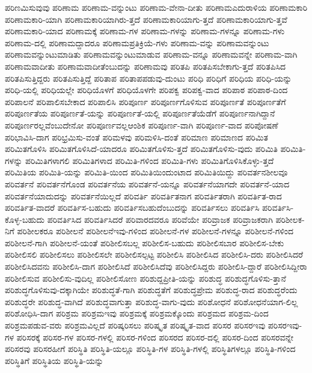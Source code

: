 {ಪರಿಣಮಿಸುವುವು
ಪರಿಣಾಮ
ಪರಿಣಾಮ-ವನ್ನುಂಟು
ಪರಿಣಾಮ-ವೇನಾ-ದೀತು
ಪರಿಣಾಮಎದುರಾಳಿಯ
ಪರಿಣಾಮಕಾರಿ
ಪರಿಣಾಮಕಾರಿ-ಯಾಗಿ
ಪರಿಣಾಮಕಾರಿಯಾಗಿರು-ತ್ತದೆ
ಪರಿಣಾಮಕಾರಿಯಾಗು-ತ್ತದೆ
ಪರಿಣಾಮಕಾರಿಯಾಗು-ತ್ತವೆ
ಪರಿಣಾಮಕಾರಿ-ಯಾದ
ಪರಿಣಾಮಕ್ಕೆ
ಪರಿಣಾಮ-ಗಳ
ಪರಿಣಾಮ-ಗಳನ್ನು
ಪರಿಣಾಮ-ಗಳನ್ನೂ
ಪರಿಣಾಮ-ಗಳು
ಪರಿಣಾಮ-ದಲ್ಲಿ
ಪರಿಣಾಮದ್ದಾದರೂ
ಪರಿಣಾಮಪ್ರತಿಕ್ರಿಯೆ-ಗಳು
ಪರಿಣಾಮ-ವನ್ನು
ಪರಿಣಾಮವನ್ನುಂಟು
ಪರಿಣಾಮವನ್ನುಂಟುಮಾಡಿತು
ಪರಿಣಾಮವನ್ನುಂಟುಮಾಡುವ
ಪರಿಣಾಮ-ವನ್ನೂ
ಪರಿಣಾಮವನ್ನೇ
ಪರಿಣಾಮ-ವಾಗಿ
ಪರಿಣಾಮವಾದೀತು
ಪರಿಣಾಮವಾದೀತೆಂಬುದನ್ನು
ಪರಿಣಾಮವು
ಪರಿತಪಿ
ಪರಿತಪಿಸಬೇಕಾಗು-ತ್ತದೆ
ಪರಿತಪಿಸಿದ
ಪರಿತಪಿಸುತ್ತಿದ್ದರು
ಪರಿತಪಿಸುತ್ತಿದ್ದೆ
ಪರಿತಾಪ
ಪರಿತಾಪಪಡುವು-ದುಂಟು
ಪರಿಧಿ
ಪರಿಧಿಗೆ
ಪರಿಧಿಯ
ಪರಿಧಿ-ಯನ್ನು
ಪರಿಧಿ-ಯಲ್ಲಿ
ಪರಿಧಿಯಲ್ಲೇ
ಪರಿಧಿಯೊಳಗೆ
ಪರಿಧಿಯೊಳಗೇ
ಪರಿಪಕ್ವ
ಪರಿಪಕ್ವ-ವಾದ
ಪರಿಪಾಠ
ಪರಿಪಾಠ-ದಿಂದ
ಪರಿಪಾಲನೆ
ಪರಿಪಾಲಿಸಬೇಕಾದ
ಪರಿಪಾಲಿಸಿ
ಪರಿಪೂರ್ಣ
ಪರಿಪೂರ್ಣಗೊಳಿಸುವ
ಪರಿಪೂರ್ಣತೆ
ಪರಿಪೂರ್ಣತೆಗೆ
ಪರಿಪೂರ್ಣತೆಯ
ಪರಿಪೂರ್ಣತೆ-ಯನ್ನು
ಪರಿಪೂರ್ಣತೆ-ಯಲ್ಲಿ
ಪರಿಪೂರ್ಣತೆಯೆಡೆಗೆ
ಪರಿಪೂರ್ಣನಾಗಿದ್ದಾನೆ
ಪರಿಪೂರ್ಣರಲ್ಲವೆಂಬುದೇನೋ
ಪರಿಪೂರ್ಣವಲ್ಲಆಂಶಿಕ
ಪರಿಪೂರ್ಣ-ವಾಗಿ
ಪರಿಪೂರ್ಣ-ವಾದ
ಪರಿಪೋಷಣೆ
ಪರಿಭಾವಿಸಿ-ದಾಗ
ಪರಿಭ್ರಮಿಸು-ವಂತೆ
ಪರಿಮಳವು
ಪರಿಮಳಿಸಿ-ದಂತೆ
ಪರಿಮಾಣ
ಪರಿಮಾಣದ
ಪರಿಮಿತ
ಪರಿಮಿತಗೊಳಿಸಿ
ಪರಿಮಿತಗೊಳಿಸಿದೆ-ಯಾದರೂ
ಪರಿಮಿತಗೊಳಿಸು-ತ್ತದೆ
ಪರಿಮಿತಗೊಳಿಸು-ವುದು
ಪರಿಮಿತಿ
ಪರಿಮಿತಿ-ಗಳನ್ನು
ಪರಿಮಿತಿಗಳಾಗಲಿ
ಪರಿಮಿತಿಗಳಾದ
ಪರಿಮಿತಿ-ಗಳಿಂದ
ಪರಿಮಿತಿ-ಗಳು
ಪರಿಮಿತಿಗೊಳಿಸಿಕೊಳ್ಳು-ತ್ತದೆ
ಪರಿಮಿತಿಯ
ಪರಿಮಿತಿ-ಯನ್ನು
ಪರಿಮಿತಿ-ಯಿಂದ
ಪರಿಮಿತಿಯಿಂದುಂಟಾದ
ಪರಿಮಿತಿಯಿದ್ದು
ಪರಿವರ್ತನಶೀಲವೂ
ಪರಿವರ್ತನೆ
ಪರಿವರ್ತನೆಗೊಂಡ
ಪರಿವರ್ತನೆಯ
ಪರಿವರ್ತನೆ-ಯನ್ನೂ
ಪರಿವರ್ತನೆಯಾಗದೇ
ಪರಿವರ್ತನೆ-ಯಾದ
ಪರಿವರ್ತನೆಯಾದುದನ್ನು
ಪರಿವರ್ತನೆಯಿಲ್ಲದೆ
ಪರಿವರ್ತಿ
ಪರಿವರ್ತಿತನಾಗ
ಪರಿವರ್ತಿತರಾಗಿ
ಪರಿವರ್ತಿತ-ರಾದ
ಪರಿವರ್ತಿತ-ವಾದರೆ
ಪರಿವರ್ತಿಸ-ಬಹುದು
ಪರಿವರ್ತಿಸಬಹುದೆಂಬುದನ್ನು
ಪರಿವರ್ತಿಸಲು
ಪರಿವರ್ತಿಸಿ
ಪರಿವರ್ತಿಸಿ-ಕೊಳ್ಳ-ಬಹುದು
ಪರಿವರ್ತಿಸಿದ
ಪರಿವರ್ತಿಸಿದರೆ
ಪರಿವಾರದವರೂ
ಪರಿವೆಯೇ
ಪರಿವ್ರಾಜಕ
ಪರಿವ್ರಾಜಕರಾಗಿ
ಪರಿಶೀಲಕ-ನಿಗೆ
ಪರಿಶೀಲಕರೂ
ಪರಿಶೀಲನೆ
ಪರಿಶೀಲನೆಇವು-ಗಳಿಂದ
ಪರಿಶೀಲನೆ-ಗಳ
ಪರಿಶೀಲನೆ-ಗಳನ್ನೂ
ಪರಿಶೀಲನೆ-ಗಳಿಂದ
ಪರಿಶೀಲನೆ-ಗಾಗಿ
ಪರಿಶೀಲನೆ-ಯಂತೆ
ಪರಿಶೀಲಿಸಬಲ್ಲ
ಪರಿಶೀಲಿಸ-ಬಹುದು
ಪರಿಶೀಲಿಸಬಾರ
ಪರಿಶೀಲಿಸ-ಬೇಕು
ಪರಿಶೀಲಿಸಲಿ
ಪರಿಶೀಲಿಸಲು
ಪರಿಶೀಲಿಸಲೇ
ಪರಿಶೀಲಿಸಲ್ಪಟ್ಟ
ಪರಿಶೀಲಿಸಿ
ಪರಿಶೀಲಿಸಿದ
ಪರಿಶೀಲಿಸಿ-ದರು
ಪರಿಶೀಲಿಸಿದರೆ
ಪರಿಶೀಲಿಸಿದವನು
ಪರಿಶೀಲಿಸಿ-ದಾಗ
ಪರಿಶೀಲಿಸಿದೆ
ಪರಿಶೀಲಿಸಿದೆವು
ಪರಿಶೀಲಿಸಿದ್ದರು
ಪರಿಶೀಲಿಸಿ-ದ್ದಾರೆ
ಪರಿಶೀಲಿಸಿದ್ದೀರಾ
ಪರಿಶೀಲಿಸುವ
ಪರಿಶೀಲಿಸು-ವುದಿಲ್ಲ
ಪರಿಶೀಲಿಸೋಣ
ಪರಿಶುದ್ದಪ್ರೀತಿ-ಯನ್ನು
ಪರಿಶುದ್ಧ
ಪರಿಶುದ್ಧಗೊಳಿಸು-ತ್ತಾನೆ
ಪರಿಶುದ್ಧಗೊಳಿಸುವು-ದಕ್ಕಾಗಿಯೇ
ಪರಿಶುದ್ಧತೆ-ಗಾಗಿ
ಪರಿಶುದ್ಧತೆಗೆ
ಪರಿಶುದ್ಧಪ್ರೇಮ
ಪರಿಶುದ್ಧ-ರಾದ
ಪರಿಶುದ್ಧರೆಂದು
ಪರಿಶುದ್ಧರೇ
ಪರಿಶುದ್ಧ-ವಾಗಿದೆ
ಪರಿಶುದ್ಧವಾಗುತ್ತಾ
ಪರಿಶುದ್ಧ-ವಾಗು-ವುದು
ಪರಿಶೋಧನೆ
ಪರಿಶೋಧನೆಯಾಗ-ಲಿಲ್ಲ
ಪರಿಶೋಧಿಸಿ-ದಾಗ
ಪರಿಶ್ರಮ
ಪರಿಶ್ರಮಇವು
ಪರಿಶ್ರಮಕ್ಕೆ
ಪರಿಶ್ರಮಕ್ಕೊಂದು
ಪರಿಶ್ರಮದ
ಪರಿಶ್ರಮ-ದಿಂದ
ಪರಿಶ್ರಮಪಡುವ-ವರು
ಪರಿಶ್ರಮವಿಲ್ಲದೆ
ಪರಿಷ್ಕರಿಸಲು
ಪರಿಷ್ಕೃತ
ಪರಿಷ್ಕೃತ-ವಾದ
ಪರಿಸರ
ಪರಿಸರಇವು
ಪರಿಸರಇವು-ಗಳ
ಪರಿಸರಕ್ಕೆ
ಪರಿಸರ-ಗಳ
ಪರಿಸರ-ಗಳಲ್ಲಿ
ಪರಿಸರ-ಗಳಿಂದ
ಪರಿಸರದ
ಪರಿಸರ-ದಲ್ಲಿ
ಪರಿಸರ-ದಿಂದ
ಪರಿಸರವನ್ನೇ
ಪರಿಸರವು
ಪರಿಸರಹೀಗೆ
ಪರಿಸ್ಥಿತಿ
ಪರಿಸ್ಥಿತಿ-ಯಲ್ಲೂ
ಪರಿಸ್ಥಿತಿ-ಗಳ
ಪರಿಸ್ಥಿತಿ-ಗಳಲ್ಲಿ
ಪರಿಸ್ಥಿತಿಗಳಲ್ಲೂ
ಪರಿಸ್ಥಿತಿ-ಗಳಿಂದ
ಪರಿಸ್ಥಿತಿಗೆ
ಪರಿಸ್ಥಿತಿಯ
ಪರಿಸ್ಥಿತಿ-ಯನ್ನು
}
